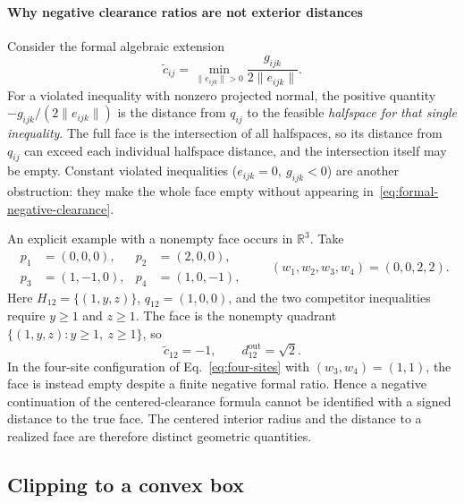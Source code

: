 \paragraph{Why negative clearance ratios are not exterior distances}
Consider the formal algebraic extension
\begin{equation}
\widetilde c_{ij}=
\min_{\|e_{ijk}\|>0}\frac{g_{ijk}}{2\|e_{ijk}\|}.
\label{eq:formal-negative-clearance}
\end{equation}
For a violated inequality with nonzero projected normal, the positive quantity $-g_{ijk}/(2\|e_{ijk}\|)$ is the distance from $q_{ij}$ to the feasible \emph{halfspace for that single inequality}. The full face is the intersection of all halfspaces, so its distance from $q_{ij}$ can exceed each individual halfspace distance, and the intersection itself may be empty. Constant violated inequalities ($e_{ijk}=0,\ g_{ijk}<0$) are another obstruction: they make the whole face empty without appearing in~\eqref{eq:formal-negative-clearance}.

An explicit example with a nonempty face occurs in $\mathbb R^3$. Take
\begin{equation}
\begin{aligned}
p_1&=(0,0,0), & p_2&=(2,0,0),\\
p_3&=(1,-1,0), & p_4&=(1,0,-1),
\end{aligned}
\qquad
(w_1,w_2,w_3,w_4)=(0,0,2,2).
\label{eq:exterior-counterexample}
\end{equation}
Here $H_{12}=\{(1,y,z)\}$, $q_{12}=(1,0,0)$, and the two competitor inequalities require $y\ge1$ and $z\ge1$. The face is the nonempty quadrant $\{(1,y,z):y\ge1,\ z\ge1\}$, so
\begin{equation}
\widetilde c_{12}=-1,
\qquad d_{12}^{\mathrm{out}}=\sqrt2.
\label{eq:exterior-example-values}
\end{equation}
In the four-site configuration of Eq.~\eqref{eq:four-sites} with $(w_3,w_4)=(1,1)$, the face is instead empty despite a finite negative formal ratio. Hence a negative continuation of the centered-clearance formula cannot be identified with a signed distance to the true face. The centered interior radius and the distance to a realized face are therefore distinct geometric quantities.

\subsection{Clipping to a convex box}
\label{app:geometry-clipping}

